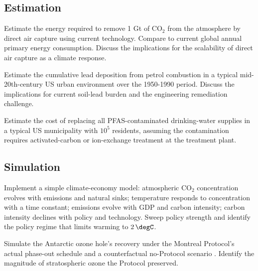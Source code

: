 \subsection*{Estimation}

\begin{exercise}
Estimate the energy required to remove 1 Gt of CO$_2$ from the atmosphere by direct air capture using current technology. Compare to current global annual primary energy consumption. Discuss the implications for the scalability of direct air capture as a climate response.
\end{exercise}

\begin{exercise}
Estimate the cumulative lead deposition from petrol combustion in a typical mid-20th-century US urban environment over the 1950-1990 period. Discuss the implications for current soil-lead burden and the engineering remediation challenge.
\end{exercise}

\begin{exercise}
Estimate the cost of replacing all PFAS-contaminated drinking-water supplies in a typical US municipality with $10^5$ residents, assuming the contamination requires activated-carbon or ion-exchange treatment at the treatment plant.
\end{exercise}

\subsection*{Simulation}

\begin{exercise}
Implement a simple climate-economy model: atmospheric CO$_2$ concentration evolves with emissions and natural sinks; temperature responds to concentration with a time constant; emissions evolve with GDP and carbon intensity; carbon intensity declines with policy and technology. Sweep policy strength and identify the policy regime that limits warming to $2\,\degC$.
\end{exercise}

\begin{exercise}
Simulate the Antarctic ozone hole's recovery under the Montreal Protocol's actual phase-out schedule and a counterfactual no-Protocol scenario \cite{law:montreal-protocol-1987,paper:farman-1985}. Identify the magnitude of stratospheric ozone the Protocol preserved.
\end{exercise}

